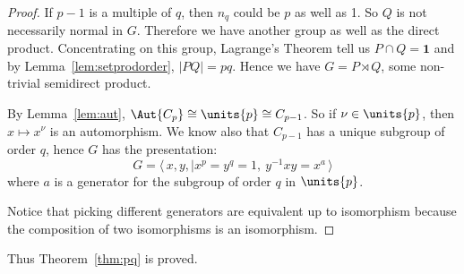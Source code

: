 \begin{proof}
    If \(p-1\) is a multiple of \(q\), then \(n_q\) could be \(p\) as well as 1.
    So \(Q\) is not necessarily normal in \(G\).
    Therefore we have another group as well as the direct product.
    Concentrating on this group, Lagrange's Theorem tell us \(P \cap Q = \bm{1}\) and by Lemma~\ref{lem:setprodorder}, \(|PQ| = pq\).
    Hence we have \(G = P \rtimes Q\), some non-trivial semidirect product.

    By Lemma~\ref{lem:aut}, \(\Aut{C_p} \cong \units{p} \cong C_{p-1}\).
    So if \(\nu \in \units{p}\), then \(x \mapsto x^\nu\) is an automorphism.
    We know also that \(C_{p-1}\) has a unique subgroup of order \(q\),
    hence \(G\) has the presentation:
    \[G = \langle \, x, y, \mid x^p = y^q = 1,\ y^{-1}xy = x^a \, \rangle\]
    where \(a\) is a generator for the subgroup of order \(q\) in \(\units{p}\).

    Notice that picking different generators are equivalent up to isomorphism because the composition of two
    isomorphisms is an isomorphism.
\end{proof}

Thus Theorem~\ref{thm:pq} is proved.
